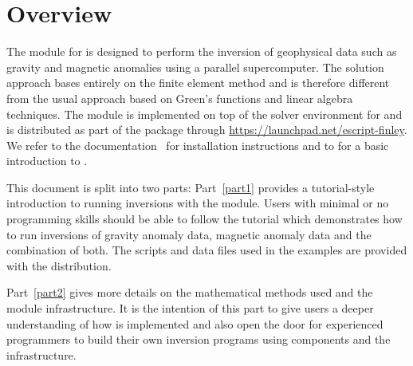 
%
%
%


\chapter*{Overview}\label{sec:Intro}
The \downunder module for \python is designed to perform the inversion of
geophysical data such as gravity and magnetic anomalies using a parallel
supercomputer.
The solution approach bases entirely on the finite element method and is
therefore different from the usual approach based on Green's functions
and linear algebra techniques.
The module is implemented on top of the \escript solver environment for
\python and is distributed as part of the \escript package through
\url{https://launchpad.net/escript-finley}.
We refer to the \escript documentation~\cite{ESCRIPT} for installation
instructions and to \cite{ESCRIPTCOOKBOOK} for a basic introduction to \escript.

This document is split into two parts:
Part~\ref{part1} provides a tutorial-style introduction to running inversions
with the \downunder module.
Users with minimal or no programming skills should be able to follow the
tutorial which demonstrates how to run inversions of gravity anomaly data,
magnetic anomaly data and the combination of both.
The scripts and data files used in the examples are provided with the \escript
distribution.

Part~\ref{part2} gives more details on the mathematical methods used and the
module infrastructure.
It is the intention of this part to give users a deeper understanding of how
\downunder is implemented and also open the door for experienced \python
programmers to build their own inversion programs using \downunder components
and the \escript infrastructure. 

